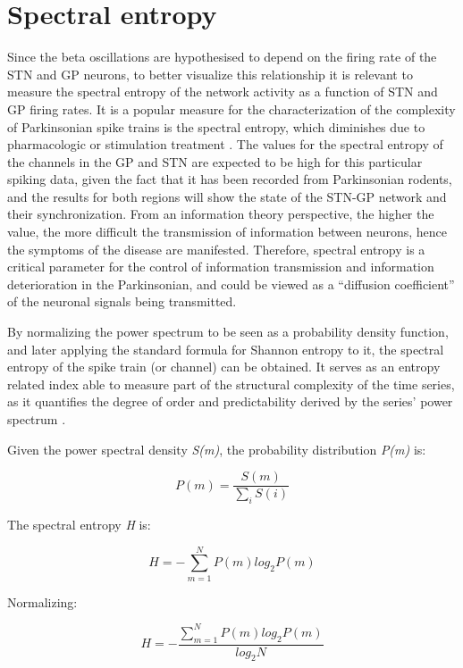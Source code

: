 \documentclass{kththesis}
\begin{document}
\section{Spectral entropy}

Since the beta oscillations are hypothesised to depend on the firing rate of the STN and GP neurons, to better visualize this relationship it is relevant to measure the spectral entropy of the network activity as a function of STN and GP firing rates. 
It is a popular measure for the characterization of the complexity of Parkinsonian spike trains is the spectral entropy, which diminishes due to pharmacologic or stimulation treatment \parencite{Andres}. 
The values for the spectral entropy of the channels in the GP and STN are expected to be high for this particular spiking data, given the fact that it has been recorded from Parkinsonian rodents, and the results for both regions will show the state of the STN-GP network and their synchronization. From an information theory perspective, the higher the value, the more difficult the transmission of information between neurons, hence the symptoms of the disease are manifested. Therefore, spectral entropy is a critical parameter for the control of information transmission and information deterioration in the Parkinsonian, and could be viewed as a “diffusion coefficient” of the neuronal signals being transmitted.

By normalizing the power spectrum to be seen as a probability density function, and later applying the standard formula for Shannon entropy to it, the spectral entropy of the spike train (or channel) can be obtained. 
It serves as an entropy related index able to measure part of the structural complexity of the time series, as it quantifies the degree of order and predictability derived by the series' power spectrum \parencite{Zacca}.

Given the power spectral density \textit{S(m)}, the probability distribution \textit{P(m)} is:

\begin{equation}
P(m) = \frac{S(m)}{\sum_i S(i)}
\end{equation}

The spectral entropy \textit{H} is:

\begin{equation}
H = -\sum_{m=1}^N P(m) log_2 P(m)
\end{equation}

Normalizing:

\begin{equation}
H = -\frac{\sum_{m=1}^N P(m) log_2 P(m)}{log_2 N}
\end{equation}
\end{document}
